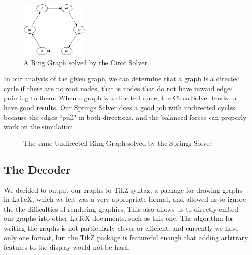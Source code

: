 \documentclass{article}
\begin{document}
\begin{figure}[h!]
\caption{A Ring Graph solved by the Circo Solver}
\centering
\includegraphics[width=0.3\textwidth]{circo.jpg}
\end{figure}

In our analysis of the given graph, we can determine that a graph is a directed cycle if there are no root nodes, that is nodes that do not have inward edges pointing to them. When a graph is a directed cycle, the Circo Solver tends to have good results. Our Springs Solver does a good job with undirected cycles because the edges ``pull" in both directions, and the balanced forces can properly work on the simulation. 

\begin{figure}
\caption{The same Undirected Ring Graph solved by the Springs Solver}
\end{figure}


\subsection{The Decoder}
We decided to output our graphs to TikZ syntax, a package for drawing graphs in LaTeX, which we felt was a very appropriate format, and allowed us to ignore the 
the difficulties of rendering graphics. This also allows us to directly embed our graphs into other LaTeX documents, such as this one. The algorithm for 
writing the graphs is not particularly clever or efficient, and currently we have only one format, but the TikZ package is featureful enough that adding arbitrary
features to the display would not be hard.
\end{document}
